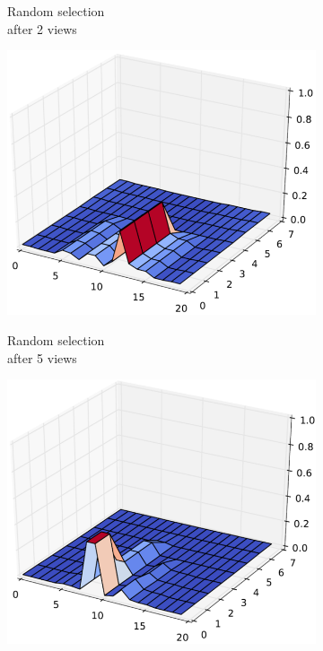 \documentclass[letterpaper, 10 pt, conference]{ieeeconf}  %
\begin{document}
\begin{figure}
\begin{subfigure}[b]{.24\textwidth}
        \caption{Random selection \\ after 2 views}
        \vspace*{2mm}
        \label{fig:rand2view}
    \end{subfigure}
    \hfill
    \begin{subfigure}[b]{.24\textwidth}
        \centering
        {\includegraphics[width=.99\textwidth]{random3.png}}
        \caption{Random selection \\ after 5 views}
        \vspace*{2mm}
        \label{fig:rand5view}
    \end{subfigure}
    \hfill
    \begin{subfigure}[b]{.24\textwidth}
        \centering
        {\includegraphics[width=.99\textwidth]{random4.png}}

\end{subfigure}
\end{figure}
\end{document}
